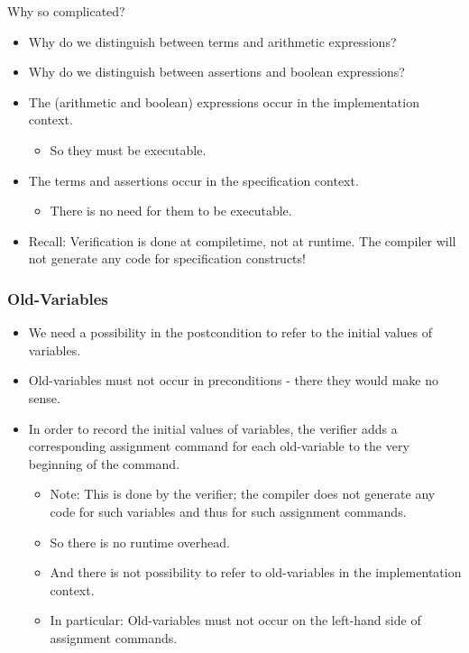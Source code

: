 \begin{multicols}{2}
Why so complicated?
\begin{itemize}
  \item Why do we distinguish between terms and arithmetic expressions?
  \item Why do we distinguish between assertions and boolean expressions?
  \item The (arithmetic and boolean) expressions occur in the implementation context.
  \begin{itemize}
    \item So they must be executable.
  \end{itemize}
  \item The terms and assertions occur in the specification context.
  \begin{itemize}
    \item There is no need for them to be executable.
  \end{itemize}
  \item Recall: Verification is done at compiletime, not at runtime. The compiler will not generate any code for specification constructs!
\end{itemize}

\subsubsection{Old-Variables}
\begin{itemize}
  \item We need a possibility in the postcondition to refer to the initial values of variables.
  \item Old-variables must not occur in preconditions - there they would make no sense.
  \item In order to record the initial values of variables, the verifier adds a corresponding assignment command for each old-variable to the very beginning of the command.
  \begin{itemize}
    \item Note: This is done by the verifier; the compiler does not generate any code for such variables and thus for such assignment commands.
    \item So there is no runtime overhead.
    \item And there is not possibility to refer to old-variables in the implementation context.
    \item In particular: Old-variables must not occur on the left-hand side of assignment commands.
  \end{itemize}
\end{itemize}


\end{multicols}
